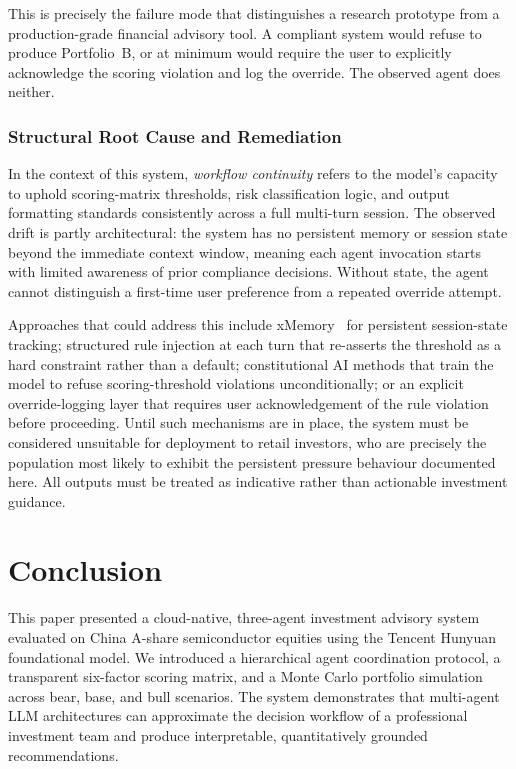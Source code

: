 \documentclass[11pt,a4paper]{article}
\begin{document}
This is precisely the failure mode that distinguishes a research
prototype from a production-grade financial advisory tool. A
compliant system would refuse to produce Portfolio~B, or at minimum
would require the user to explicitly acknowledge the scoring violation
and log the override. The observed agent does neither.

\subsubsection*{Structural Root Cause and Remediation}

In the context of this system, \textit{workflow continuity} refers to
the model's capacity to uphold scoring-matrix thresholds, risk
classification logic, and output formatting standards consistently
across a full multi-turn session. The observed drift is partly
architectural: the system has no persistent memory or session state
beyond the immediate context window, meaning each agent invocation
starts with limited awareness of prior compliance decisions. Without
state, the agent cannot distinguish a first-time user preference from
a repeated override attempt.

Approaches that could address this include xMemory~\cite{hu2026xmemory}
for persistent session-state tracking; structured rule injection at
each turn that re-asserts the threshold as a hard constraint rather
than a default; constitutional AI methods that train the model to
refuse scoring-threshold violations unconditionally; or an explicit
override-logging layer that requires user acknowledgement of the rule
violation before proceeding. Until such mechanisms are in place, the
system must be considered unsuitable for deployment to retail investors,
who are precisely the population most likely to exhibit the persistent
pressure behaviour documented here. All outputs must be treated as
indicative rather than actionable investment guidance.

\section{Conclusion}
\label{sec:conclusion}

This paper presented a cloud-native, three-agent investment advisory
system evaluated on China A-share semiconductor equities using the
Tencent Hunyuan foundational model. We introduced a hierarchical agent
coordination protocol, a transparent six-factor scoring matrix, and a
Monte Carlo portfolio simulation across bear, base, and bull scenarios.
The system demonstrates that multi-agent LLM architectures can
approximate the decision workflow of a professional investment team and
produce interpretable, quantitatively grounded recommendations.
\end{document}
